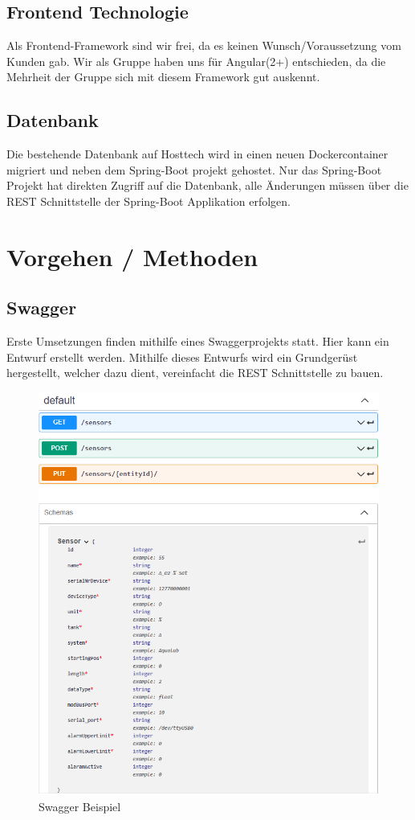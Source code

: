 \documentclass[a4paper]{article}
\begin{document}
	\subsection{Frontend Technologie}
	Als Frontend-Framework sind wir frei, da es keinen Wunsch/Voraussetzung vom Kunden gab.
	Wir als Gruppe haben uns für Angular(2+) entschieden, da die Mehrheit der Gruppe sich mit diesem Framework gut auskennt. 
	
	\subsection{Datenbank}
	Die bestehende Datenbank auf Hosttech wird in einen neuen Dockercontainer migriert und neben dem Spring-Boot projekt gehostet. Nur das Spring-Boot Projekt hat direkten Zugriff auf die Datenbank, alle Änderungen müssen über die REST Schnittstelle der Spring-Boot Applikation erfolgen. 
	
	\section{Vorgehen / Methoden}
	
	\subsection{Swagger}
	Erste Umsetzungen finden mithilfe eines Swaggerprojekts statt. Hier kann ein Entwurf erstellt werden. Mithilfe dieses Entwurfs wird ein Grundgerüst hergestellt, welcher dazu dient, vereinfacht die REST Schnittstelle zu bauen.

	\begin{figure}[h]
		\centering
		\includegraphics[scale=0.4]{Swagger}
		\caption{Swagger Beispiel}
		\label{fig:Swagger}
	\end{figure}
\end{document}
